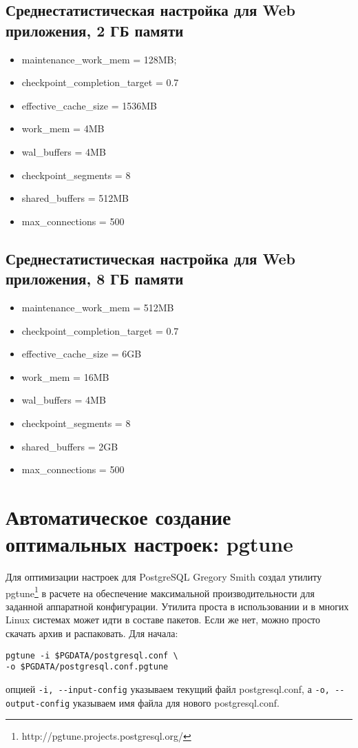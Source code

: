 \subsection{Среднестатистическая настройка для Web приложения, 2 ГБ памяти}

\begin{itemize}
\item maintenance\_work\_mem = 128MB;
\item checkpoint\_completion\_target = 0.7
\item effective\_cache\_size = 1536MB
\item work\_mem = 4MB
\item wal\_buffers = 4MB
\item checkpoint\_segments = 8
\item shared\_buffers = 512MB
\item max\_connections = 500
\end{itemize}

\subsection{Среднестатистическая настройка для Web приложения, 8 ГБ памяти}

\begin{itemize}
\item maintenance\_work\_mem = 512MB
\item checkpoint\_completion\_target = 0.7
\item effective\_cache\_size = 6GB
\item work\_mem = 16MB
\item wal\_buffers = 4MB
\item checkpoint\_segments = 8
\item shared\_buffers = 2GB
\item max\_connections = 500
\end{itemize}

\section{Автоматическое создание оптимальных настроек: pgtune}

Для оптимизации настроек для PostgreSQL Gregory Smith создал утилиту pgtune\footnote{http://pgtune.projects.postgresql.org/} 
в расчете на обеспечение максимальной производительности для заданной аппаратной конфигурации.
Утилита проста в использовании и в многих Linux системах может идти в составе пакетов. 
Если же нет, можно просто скачать архив и распаковать.
Для начала:
\begin{lstlisting}[label=lst:p_settings1,caption=Pgtune]
pgtune -i $PGDATA/postgresql.conf \
-o $PGDATA/postgresql.conf.pgtune
\end{lstlisting}
опцией 
\lstinline[frame=tblr]{-i, --input-config}
указываем текущий файл postgresql.conf, 
а 
\lstinline[frame=tblr]{-o, --output-config}
указываем имя файла для нового postgresql.conf.

